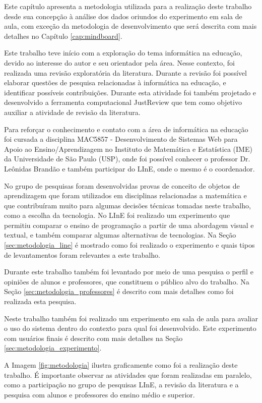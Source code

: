 Este capítulo apresenta a metodologia utilizada para a realização deste trabalho desde sua concepção à análise dos dados oriundos do experimento em sala de aula, com exceção da  metodologia de desenvolvimento que será descrita com mais detalhes no Capítulo \ref{cap:mindboard}. 



Este trabalho teve início com a exploração do tema informática na educação, devido ao interesse do autor e seu orientador pela área. Nesse contexto, foi realizada uma revisão exploratória da literatura. Durante a revisão foi possível elaborar questões de pesquisa relacionadas à informática na educação, e identificar possíveis contribuições. Durante esta atividade foi também projetado e desenvolvido a ferramenta computacional JustReview \cite{justreview_artigo} que tem como objetivo auxiliar a atividade de revisão da literatura.

Para reforçar o conhecimento e contato com a área de informática na educação foi cursada a disciplina MAC5857 - Desenvolvimento de Sistemas Web para Apoio ao Ensino/Aprendizagem no Instituto de Matemática e Estatística (IME) da Universidade de São Paulo (USP), onde foi possível conhecer o professor Dr. Leônidas Brandão e também participar do LInE, onde o mesmo é o coordenador.

No grupo de pesquisas foram desenvolvidas provas de conceito de objetos de aprendizagem que foram utilizados em disciplinas relacionadas a matemática e que contribuíram muito para algumas decisões técnicas tomadas neste trabalho, como a escolha da tecnologia. No LInE foi realizado um experimento que permitiu comparar o ensino de programação a partir de uma abordagem visual e textual, e também comparar algumas alternativas de tecnologias. Na Seção \ref{sec:metodologia_line} é mostrado como foi realizado o experimento e quais tipos de levantamentos foram relevantes a este trabalho.

Durante este trabalho também foi levantado por meio de uma pesquisa o perfil e opiniões de alunos e professores, que constituem o público alvo do trabalho. Na Seção \ref{sec:metodologia_professores} é descrito com mais detalhes como foi realizada esta pesquisa.

Neste trabalho também foi realizado um experimento em sala de aula para avaliar o uso do sistema dentro do contexto para qual foi desenvolvido. Este experimento com usuários finais é descrito com mais detalhes na Seção \ref{sec:metodologia_experimento}.

A Imagem \ref{fig:metodologia} ilustra graficamente como foi a realização deste trabalho. É importante observar as atividades que foram realizadas em paralelo, como a participação no grupo de pesquisas LInE, a revisão da literatura e a pesquisa com alunos e professores do ensino médio e superior.

